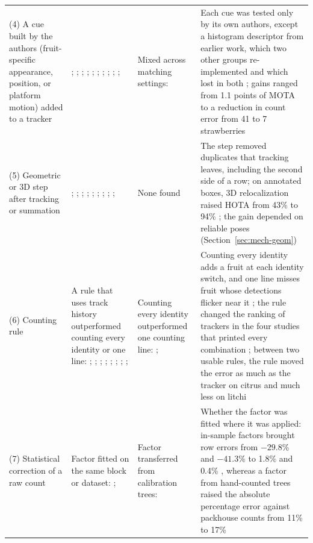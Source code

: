 \begin{table}[!t]
\begin{tabularx}{\textwidth}{@{}L{3.1cm}L{3.5cm}L{3.0cm}Y@{}}
\addlinespace
(4) A cue built by the authors (fruit-specific appearance, position, or platform motion) added to a tracker & \citet{kirk2021robust}; \citet{yang2024automatic}; \citet{dong2025fruit}; \citet{meng2024real}; \citet{hu2023fruit}; \citet{du2024green}; \citet{ahmedtaristizabal2024field}; \citet{zheng2023object}; \citet{lei2025spatio}; \citet{dai2022tracking}; \citet{piazolo2026enhanced} & Mixed across matching settings: \citet{fusaro2026horticultural} & Each cue was tested only by its own authors, except a histogram descriptor from earlier work, which two other groups re-implemented and which lost in both \citep{fusaro2026horticultural,lei2025spatio}; gains ranged from 1.1 points of MOTA \citep{dong2025fruit} to a reduction in count error from 41 to 7 strawberries \citep{kirk2021robust}\\
\addlinespace
(5) Geometric or 3D step after tracking or summation & \citet{liu2018robust}; \citet{hani2020comparative}; \citet{roy2019vision}; \citet{gongal2016apple}; \citet{wei2025multi}; \citet{santos2024multiple}; \citet{matos2024tracking}; \citet{ciarfuglia2023weakly}; \citet{zhou2024utilizing}; \citet{yoshida2026cross} & None found & The step removed duplicates that tracking leaves, including the second side of a row; on annotated boxes, 3D relocalization raised HOTA from 43\% to 94\% \citep{santos2024multiple}; the gain depended on reliable poses (Section~\ref{sec:mech-geom})\\
\addlinespace
(6) Counting rule & A rule that uses track history outperformed counting every identity or one line: \citet{zhou2024advancing}; \citet{zhang2025row}; \citet{zheng2023efficient}; \citet{rong2023tomato}; \citet{tenorio2021automatic}; \citet{an2024stratracker}; \citet{feng2026greenhouse}; \citet{matos2024tracking}; \citet{lu2025iot} & Counting every identity outperformed one counting line: \citet{parico2021real}; \citet{sasse2025object} & Counting every identity adds a fruit at each identity switch, and one line misses fruit whose detections flicker near it \citep{parico2021real}; the rule changed the ranking of trackers in the four studies that printed every combination \citep{zhou2024advancing,zhang2025row,zheng2023efficient,matos2024tracking}; between two usable rules, the rule moved the error as much as the tracker on citrus and much less on litchi \citep{zheng2023efficient,lu2025iot}\\
\addlinespace
(7) Statistical correction of a raw count & Factor fitted on the same block or dataset: \citet{wang2013automated}; \citet{indriani2026sawitmvc} & Factor transferred from calibration trees: \citet{anderson2021estimation} & Whether the factor was fitted where it was applied: in-sample factors brought row errors from $-29.8$\% and $-41.3$\% to 1.8\% and 0.4\% \citep{wang2013automated}, whereas a factor from hand-counted trees raised the absolute percentage error against packhouse counts from 11\% to 17\% \citep{anderson2021estimation}\\

\end{tabularx}
\end{table}
